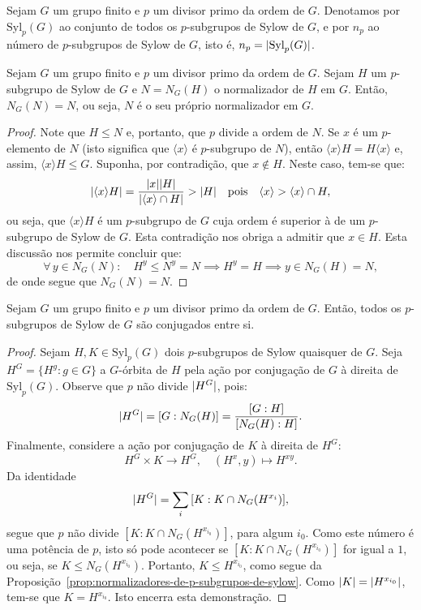 \begin{definition}
  Sejam $G$ um grupo finito e $p$ um divisor primo da ordem de $G$. Denotamos por $\text{Syl}_{p}(G)$ ao conjunto de todos os $p$-subgrupos de Sylow de $G$, e por $n_{p}$ ao número de $p$-subgrupos de Sylow de $G$, isto é, $n_{p}=\lvert\text{Syl}_{p}(G)\rvert$.
\end{definition}

\begin{proposition}\label{prop:normalizadores-de-p-subgrupos-de-sylow}
  Sejam $G$ um grupo finito e $p$ um divisor primo da ordem de $G$. Sejam $H$ um $p$-subgrupo de Sylow de $G$ e $N=N_{G}(H)$ o normalizador de $H$ em $G$. Então, $N_{G}(N)=N$, ou seja, $N$ é o seu próprio normalizador em $G$.
\end{proposition}

\begin{proof}
  Note que $H\leqslant{N}$ e, portanto, que $p$ divide a ordem de $N$. Se $x$ é um $p$-elemento de $N$ (isto significa que $\langle{x}\rangle$ é $p$-subgrupo de $N$), então $\langle{x}\rangle{H}=H\langle{x}\rangle$ e, assim, $\langle{x}\rangle{H}\leqslant{G}$. Suponha, por contradição, que $x\notin{H}$. Neste caso, tem-se que:
  \[
    \lvert\langle{x}\rangle{H}\rvert=\frac{\lvert x\rvert\lvert H\rvert}{\lvert\langle{x}\rangle\cap{H}\rvert}>\lvert H\rvert\quad\text{pois}\quad\langle{x}\rangle>\langle{x}\rangle\cap{H},
  \]
  ou seja, que $\langle{x}\rangle{H}$ é um $p$-subgrupo de $G$ cuja ordem é superior à de um $p$-subgrupo de Sylow de $G$. Esta contradição nos obriga a admitir que $x\in{H}$. Esta discussão nos permite concluir que:
  \[
    \forall\,y\in{N_{G}(N)}:\quad{H^{y}\leqslant{N^{y}=N}\implies{H^{y}=H}\implies{y\in{N_{G}(H)=N}}},
  \]
  de onde segue que $N_{G}(N)=N$.
\end{proof}

\begin{theorem}[Sylow]\label{thm:segundo-teorema-de-sylow}
  Sejam $G$ um grupo finito e $p$ um divisor primo da ordem de $G$. Então, todos os $p$-subgrupos de Sylow de $G$ são conjugados entre si.
\end{theorem}

\begin{proof}
  Sejam $H,K\in\text{Syl}_{p}(G)$ dois $p$-subgrupos de Sylow quaisquer de $G$. Seja $H^{G}=\{H^{g}:g\in{G}\}$ a $G$-órbita de $H$ pela ação por conjugação de $G$ à direita de $\text{Syl}_{p}(G)$. Observe que $p$ não divide $\lvert H^{G}\rvert$, pois:
  \[
    \lvert H^{G}\rvert=[G:N_{G}(H)]=\frac{[G:H]}{[N_{G}(H):H]}.
  \]
  Finalmente, considere a ação por conjugação de $K$ à direita de $H^{G}$:
  \[
    H^{G}\times{K}\to{H^{G}},\quad{(H^{x},y)\mapsto{H^{xy}}}.
  \]
  Da identidade
  \[
    \lvert H^{G}\rvert=\sum_{i}\,[K:K\cap{N_{G}(H^{x_{i}})}],
  \]
  segue que $p$ não divide $[K:K\cap{N_{G}(H^{x_{i_{0}}})}]$, para algum $i_{0}$. Como este número é uma potência de $p$, isto só pode acontecer se $[K:K\cap{N_{G}(H^{x_{i_{0}}})}]$ for igual a $1$, ou seja, se $K\leqslant{N_{G}(H^{x_{i_{0}}})}$. Portanto, $K\leqslant{H^{x_{i_{0}}}}$, como segue da Proposição~\ref{prop:normalizadores-de-p-subgrupos-de-sylow}. Como $\lvert K\rvert=\lvert H^{x_{i_{0}}}\rvert$, tem-se que $K=H^{x_{i_{0}}}$. Isto encerra esta demonstração.
\end{proof}

